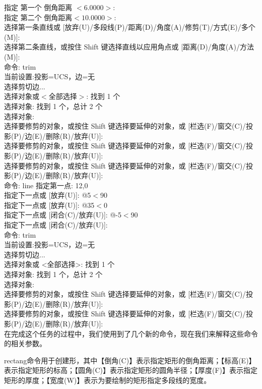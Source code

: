 指定 第一个 倒角距离 $<6.0000>$: \\
指定 第二个 倒角距离$<10.0000>$:\\
选择第一条直线或 [放弃(U)/多段线(P)/距离(D)/角度(A)/修剪(T)/方式(E)/多个(M)]:\\
选择第二条直线，或按住 Shift 键选择直线以应用角点或 [距离(D)/角度(A)/方法(M)]:\\
命令: trim\\
当前设置:投影=UCS，边=无\\
选择剪切边...\\
选择对象或$<$全部选择$>$:  找到 1 个\\
选择对象: 找到 1 个，总计 2 个\\
选择对象:\\
选择要修剪的对象，或按住 Shift 键选择要延伸的对象，或
[栏选(F)/窗交(C)/投影(P)/边(E)/删除(R)/放弃(U)]:\\
选择要修剪的对象，或按住 Shift 键选择要延伸的对象，或
[栏选(F)/窗交(C)/投影(P)/边(E)/删除(R)/放弃(U)]:\\
选择要修剪的对象，或按住 Shift 键选择要延伸的对象，或
[栏选(F)/窗交(C)/投影(P)/边(E)/删除(R)/放弃(U)]:\\
命令: line 指定第一点: 12,0\\
指定下一点或 [放弃(U)]: @5$<$90\\
指定下一点或 [放弃(U)]: @35$<$0\\
指定下一点或 [闭合(C)/放弃(U)]:   @-5$<$90\\
指定下一点或 [闭合(C)/放弃(U)]:\\
命令: trim\\
当前设置:投影=UCS，边=无\\
选择剪切边...\\
选择对象或 <全部选择>:  找到 1 个\\
选择对象: 找到 1 个，总计 2 个\\
选择对象:\\
选择要修剪的对象，或按住 Shift 键选择要延伸的对象，或
[栏选(F)/窗交(C)/投影(P)/边(E)/删除(R)/放弃(U)]:\\
选择要修剪的对象，或按住 Shift 键选择要延伸的对象，或
[栏选(F)/窗交(C)/投影(P)/边(E)/删除(R)/放弃(U)]:\\
\indent
在完成这个任务的过程中，我们使用到了几个新的命令，现在我们来解释这些命令的相关参数。

 rectang命令用于创建形，其中【倒角(C)】表示指定矩形的倒角距离；【标高(E)】表示指定矩形的标高；【圆角(C)】表示指定矩形的圆角半径；【厚度(F)】表示指定矩形的厚度；【宽度(W)】表示为要绘制的矩形指定多段线的宽度。
 
